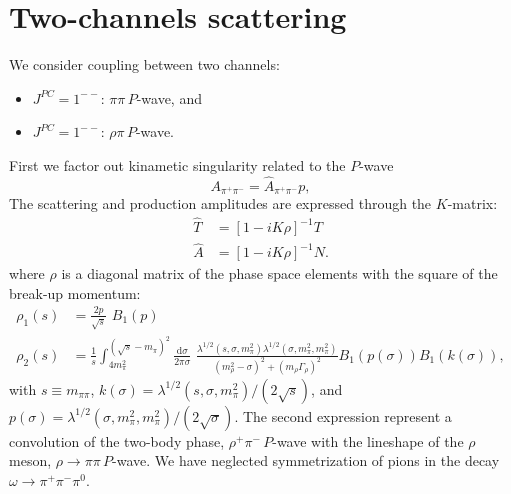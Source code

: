 \documentclass[aps,prd,superscriptaddress,onecolumn,nofootinbib,preprintnumbers,notitlepage]{revtex4-1}
\newcommand{\diff}{\mathrm{d}}
\begin{document}
\section{Two-channels scattering}
We consider coupling between two channels:
\begin{itemize}
  \item $J^{PC}=1^{--}$: $\pi\pi\,P$-wave, and
  \item $J^{PC}=1^{--}$: $\rho\pi\,P$-wave.
\end{itemize}

First we factor out kinametic singularity related to the $P$-wave
\begin{equation}
  A_{\pi^+\pi^-} = \hat{A}_{\pi^+\pi^-} p, %
\end{equation}
The scattering and production amplitudes are expressed through the $K$-matrix:
\begin{align} \label{eq:T.2x2}
  \hat{T} &= \left[1-i K \rho \right]^{-1} T\\
  \hat{A} &= \left[1-i K \rho \right]^{-1} N.
\end{align}
where $\rho$ is a diagonal matrix of the phase space elements with the square of the break-up momentum:
\begin{align}
  \rho_1(s) & = \frac{2p}{\sqrt{s}}\,\,B_1(p)\\
  \rho_2(s) & = \frac{1}{s} \int_{4m_\pi^2}^{(\sqrt{s}-m_\pi)^2} \frac{\diff \sigma}{2\pi \sigma}\,\,\frac{\lambda^{1/2}(s,\sigma,m_\pi^2) \lambda^{1/2}(\sigma,m_\pi^2,m_\pi^2)}{(m_\rho^2-\sigma)^2 + (m_\rho \Gamma_\rho)^2} B_1(p(\sigma)) B_1(k(\sigma)),
\end{align}
with $s\equiv m_{\pi\pi}$, 
$k(\sigma) = \lambda^{1/2}(s,\sigma,m_\pi^2)/(2\sqrt{s})$, and
$p(\sigma) = \lambda^{1/2}(\sigma,m_\pi^2,m_\pi^2)/(2\sqrt{\sigma})$.
The second expression represent a convolution of the two-body phase, $\rho^+\pi^-$\,$P$-wave with the lineshape of
the $\rho$ meson, $\rho\to\pi\pi$\,$P$-wave. We have neglected symmetrization of pions in the decay $\omega\to \pi^+\pi^-\pi^0$.
\end{document}
